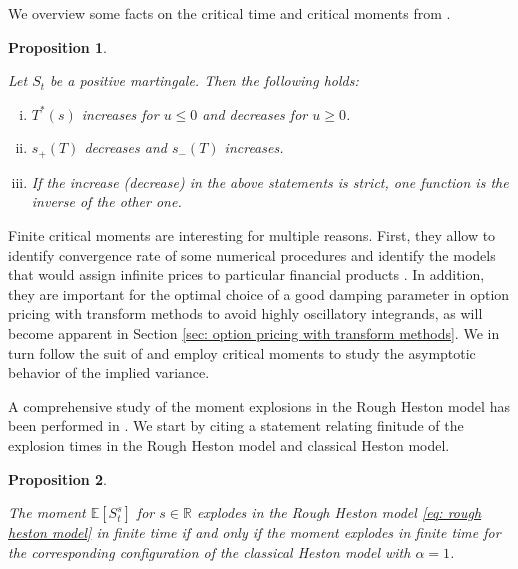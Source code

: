 \documentclass[12pt,twoside]{article}
\theoremstyle{plain}
\theoremstyle{plain}
\newtheorem{proposition}{Proposition}[section]
\theoremstyle{definition}
\theoremstyle{remark}
\numberwithin{equation}{section}
\begin{document}
We overview some facts on the critical time and critical moments from \cite{GGP18}.

\vspace{10pt}

\begin{proposition}
\label{prop: facts about critical moments}

Let $S_t$ be a positive martingale. Then the following holds:

\begin{enumerate}[(i)]
    \item 
    $T^*(s)$ increases for $u\leq 0$ and decreases for $u\geq 0$.
    \item
    $s_+(T)$ decreases and $s_-(T)$ increases.
    \item
    If the increase (decrease) in the above statements is strict, one function is the inverse of the other one.
\end{enumerate}

\end{proposition}

Finite critical moments are interesting for multiple reasons. First, they allow to identify convergence rate of some numerical procedures and identify the models that would assign infinite prices to particular financial products \cite{AP06}. In addition, they are important for the optimal choice of a good damping parameter in option pricing with transform methods to avoid highly oscillatory integrands, as will become apparent in Section \ref{sec: option pricing with transform methods}. We in turn follow the suit of \cite{FGGS10} and employ critical moments to study the asymptotic behavior of the implied variance.

A comprehensive study of the moment explosions in the Rough Heston model has been performed in \cite{GGP18}. We start by citing a statement relating finitude of the explosion times in the Rough Heston model and classical Heston model.

\vspace{10pt}

\begin{proposition}
\label{prop: moment explosions parameter space}

The moment $\mathbb E\left[S^s_t\right]$ for $s\in \mathbb R$  explodes in the Rough Heston model \eqref{eq: rough heston model} in finite time if and only if the moment explodes in finite time for the corresponding configuration of the classical Heston model with $\alpha=1$.

\end{proposition}
\end{document}
